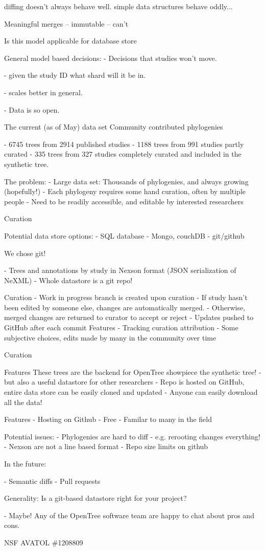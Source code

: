 \documentclass[a4paper,10pt]{article}
\begin{document}
diffing doesn't always behave well.
simple data structures behave oddly...

Meaningful merges
 -- immutable
 -- can't

Is this model applicable for database store

General model based decisions:
- Decisions that studies won't move.

- given the study ID what shard will it be in.

- scales better in general.

- Data is so open.



 The current (as of May) data set
 Community contributed phylogenies

 - 6745 trees from 2914 published studies
 - 1188 trees from 991 studies partly curated 
 - 335 trees from 327 studies completely curated and included in the synthetic tree.

 The problem:
 - Large data set: Thousands of phylogenies, and always growing (hopefully!)
 - Each phylogeny requires some hand curation, often by multiple people
 - Need to be readily accessible, and editable by interested researchers

Curation

 Potential data store options:
 - SQL database
 - Mongo, couchDB
 - git/github


 We chose git!

 - Trees and annotations by study in Nexson format  
(JSON serialization of NeXML)
 - Whole datastore is a git repo!  
 

 Curation
- Work in progress branch is created upon curation  
- If study hasn't been edited by someone else, changes are automatically merged.  
- Otherwise, merged changes are returned to curator to accept or reject
- Updates pushed to GitHub after each commit
 Features
 - Tracking curation attribution  
- Some subjective choices, edits made by many in the community over time

 Curation

 Features
 These trees are the backend for OpenTree showpiece  
 the synthetic tree!
 - but also a useful datastore for other researchers
 - Repo is hosted on GitHub, entire data store can be easily cloned and updated
 - Anyone can easily download all the data!
 
 Features
- Hosting on Github
- Free  
- Familar to  many in the field


 Potential issues:
 - Phylogenies are hard to diff - e.g. rerooting changes everything!
 - Nexson are not a line based format
 - Repo size limits on github


 In the future:

 - Semantic diffs  
 - Pull requests
 
  
Generality:
Is a git-based datastore right for your project?

 - Maybe! Any of the OpenTree software team are happy to chat about pros and cons.

NSF AVATOL \#1208809  
\end{document}
